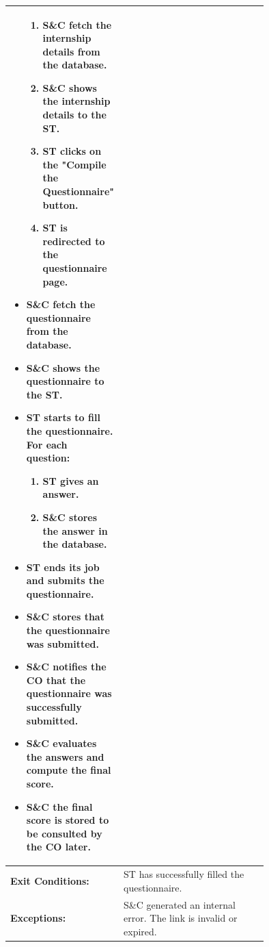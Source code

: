 \begin{center}
\begin{longtable}{|l|p{0.75\linewidth}|}
\begin{itemize}
\begin{enumerate}
                      \item S\&C fetch the internship details from the database.
                      \item S\&C shows the internship details to the ST.
                      \item ST clicks on the "Compile the Questionnaire" button.
                      \item ST is redirected to the questionnaire page.
                  \end{enumerate}
                                         \item S\&C fetch the questionnaire from the database.
                                         \item S\&C shows the questionnaire to the ST.
                                         \item ST starts to fill the questionnaire. For each question:
                                               \begin{enumerate}
                      \item ST gives an answer.
                      \item S\&C stores the answer in the database.
                  \end{enumerate}
                                         \item ST ends its job and submits the questionnaire.
                                         \item S\&C stores that the questionnaire was submitted.
                                         \item S\&C notifies the CO that the questionnaire was successfully submitted.
                                         \item S\&C evaluates the answers and compute the final score.
                                         \item S\&C the final score is stored to be consulted by the CO later.
                                     \end{itemize} \\
        \hline
        \textbf{Exit Conditions:}  & ST has successfully filled the questionnaire.                                      \\
        \hline
        \textbf{Exceptions:}       & S\&C generated an internal error. The link is invalid or expired.                  \\
        \hline
    \end{longtable}
\end{center}

